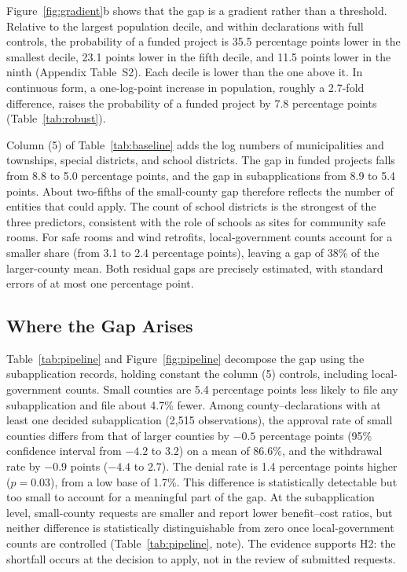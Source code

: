\documentclass[12pt]{article}
\begin{document}
Figure~\ref{fig:gradient}b shows that the gap is a gradient rather than a threshold. Relative to the largest population decile, and within declarations with full controls, the probability of a funded project is 35.5 percentage points lower in the smallest decile, 23.1 points lower in the fifth decile, and 11.5 points lower in the ninth (Appendix Table~S2). Each decile is lower than the one above it. In continuous form, a one-log-point increase in population, roughly a 2.7-fold difference, raises the probability of a funded project by 7.8 percentage points (Table~\ref{tab:robust}).

Column (5) of Table~\ref{tab:baseline} adds the log numbers of municipalities and townships, special districts, and school districts. The gap in funded projects falls from 8.8 to 5.0 percentage points, and the gap in subapplications from 8.9 to 5.4 points. About two-fifths of the small-county gap therefore reflects the number of entities that could apply. The count of school districts is the strongest of the three predictors, consistent with the role of schools as sites for community safe rooms. For safe rooms and wind retrofits, local-government counts account for a smaller share (from 3.1 to 2.4 percentage points), leaving a gap of 38\% of the larger-county mean. Both residual gaps are precisely estimated, with standard errors of at most one percentage point.

\subsection{Where the Gap Arises}

Table~\ref{tab:pipeline} and Figure~\ref{fig:pipeline} decompose the gap using the subapplication records, holding constant the column (5) controls, including local-government counts. Small counties are 5.4 percentage points less likely to file any subapplication and file about 4.7\% fewer. Among county--declarations with at least one decided subapplication (2,515 observations), the approval rate of small counties differs from that of larger counties by $-0.5$ percentage points (95\% confidence interval from $-4.2$ to $3.2$) on a mean of 86.6\%, and the withdrawal rate by $-0.9$ points ($-4.4$ to $2.7$). The denial rate is 1.4 percentage points higher ($p = 0.03$), from a low base of 1.7\%. This difference is statistically detectable but too small to account for a meaningful part of the gap. At the subapplication level, small-county requests are smaller and report lower benefit--cost ratios, but neither difference is statistically distinguishable from zero once local-government counts are controlled (Table~\ref{tab:pipeline}, note). The evidence supports H2: the shortfall occurs at the decision to apply, not in the review of submitted requests.
\end{document}
